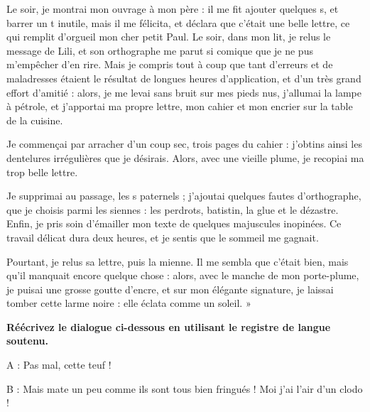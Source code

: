 \begin{keybox}[I]
Le soir, je montrai mon ouvrage à mon père : il me fit ajouter quelques s, et barrer un t inutile, mais il me félicita, et déclara que c’était une belle lettre, ce qui remplit d’orgueil mon cher petit Paul. Le soir, dans mon lit, je relus le message de Lili, et son orthographe me parut si comique que je ne pus m’empêcher d’en rire. Mais je compris tout à coup que tant d’erreurs et de maladresses étaient le résultat de longues heures d’application, et d’un très grand effort d’amitié : alors, je me levai sans bruit sur mes pieds nus, j’allumai la lampe à pétrole, et j’apportai ma propre lettre, mon cahier et mon encrier sur la table de la cuisine.

Je commençai par arracher d’un coup sec, trois pages du cahier : j’obtins ainsi les dentelures irrégulières que je désirais. Alors, avec une vieille plume, je recopiai ma trop belle lettre.

Je supprimai au passage, les s paternels ; j’ajoutai quelques fautes d’orthographe, que je choisis parmi les siennes : les perdrots, batistin, la glue et le dézastre. Enfin, je pris soin d’émailler mon texte de quelques majuscules inopinées. Ce travail délicat dura deux heures, et je sentis que le sommeil me gagnait.

Pourtant, je relus sa lettre, puis la mienne. Il me sembla que c’était bien, mais qu’il manquait encore quelque chose : alors, avec le manche de mon porte-plume, je puisai une grosse goutte d’encre, et sur mon élégante signature, je laissai tomber cette larme noire : elle éclata comme un soleil. »
\end{keybox}

\begin{keybox}[II]
\textbf{Réécrivez le dialogue ci-dessous en utilisant le registre de langue soutenu.}

A : Pas mal, cette teuf !\par
B : Mais mate un peu comme ils sont tous bien fringués ! Moi j’ai l’air d’un clodo !
\end{keybox}

